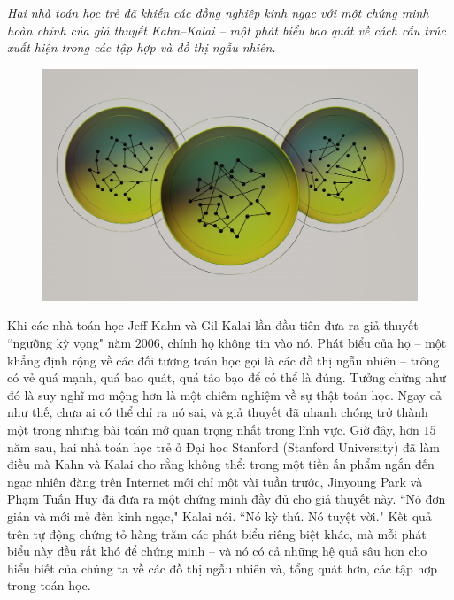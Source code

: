 \begin{multicols}{2}	
	\textit{Hai nhà toán học trẻ đã khiến các đồng nghiệp kinh ngạc với một chứng minh hoàn chỉnh của giả thuyết Kahn--Kalai -- một phát biểu bao quát về cách cấu trúc xuất hiện trong các tập hợp và đồ thị ngẫu nhiên.}
	\begin{figure}[H]
		\vspace*{-5pt}
		\centering
		\captionsetup{labelformat= empty, justification=centering}
		\includegraphics[width= 1\linewidth]{1}
		\vspace*{-10pt}
	\end{figure}
	Khi các nhà toán học Jeff Kahn và Gil Kalai lần đầu tiên đưa ra giả thuyết ``ngưỡng kỳ vọng" năm $2006$, chính họ không tin vào nó. Phát biểu của họ -- một khẳng định rộng về các đối tượng toán học gọi là các đồ thị ngẫu nhiên -- trông có vẻ quá mạnh, quá bao quát, quá táo bạo để có thể là đúng. Tưởng chừng như đó là suy nghĩ mơ mộng hơn là một chiêm nghiệm về sự thật toán học. Ngay cả như thế, chưa ai có thể chỉ ra nó sai, và giả thuyết đã nhanh chóng trở thành một trong những bài toán mở quan trọng nhất trong lĩnh vực.
	\vskip 0.1cm
	Giờ đây, hơn $15$ năm sau, hai nhà toán học trẻ ở Đại học Stanford (Stanford University) đã làm điều mà Kahn và Kalai cho rằng không thể: trong một tiền ấn phẩm ngắn đến ngạc nhiên đăng trên Internet mới chỉ một vài tuần trước, Jinyoung Park và Phạm Tuấn Huy đã đưa ra một chứng minh đầy đủ cho giả thuyết này.
	\vskip 0.1cm
	``Nó đơn giản và mới mẻ đến  kinh ngạc," Kalai nói. ``Nó kỳ thú. Nó tuyệt vời."
	\vskip 0.1cm
	Kết quả trên tự động chứng tỏ hàng trăm các phát biểu riêng biệt khác, mà mỗi phát biểu này đều rất khó để chứng minh -- và nó có cả những hệ quả sâu hơn cho hiểu biết của chúng ta về các đồ thị ngẫu nhiên và, tổng quát hơn, các tập hợp trong toán học.

\end{multicols}
